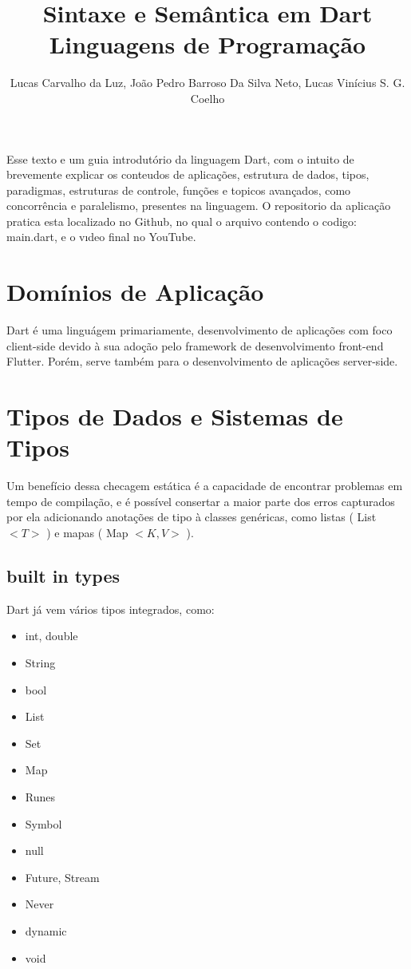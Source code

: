 \documentclass[12pt]{article}
\title{Sintaxe e Semântica em Dart\\ Linguagens de Programação}
\author{Lucas Carvalho da Luz\inst{}, João Pedro Barroso Da Silva Neto\inst{}, Lucas Vinícius S. G. Coelho\inst{}}
\begin{document}
 
\maketitle
\begin{resumo} 
  Esse texto e um guia introdutório da linguagem Dart, com o intuito de brevemente explicar
os conteudos de aplicações, estrutura de dados, tipos, paradigmas, estruturas de controle,
funções e topicos avançados, como concorrência e paralelismo, presentes na linguagem.
O repositorio da aplicação pratica esta localizado no Github, no qual o arquivo
contendo o codigo: main.dart, e o vıdeo final no YouTube.

\end{resumo}

\section{Domínios de Aplicação}
Dart é uma linguágem primariamente, desenvolvimento de aplicações com foco client-side devido à sua adoção pelo framework de desenvolvimento front-end Flutter. Porém, serve também para o desenvolvimento de aplicações server-side.

\section{Tipos de Dados e Sistemas de Tipos}
Um benefício dessa checagem estática é a capacidade de encontrar problemas em tempo de compilação, e é possível consertar a maior parte dos erros capturados por ela adicionando anotações de tipo à classes genéricas, como listas ( List $<T>$ ) e mapas ( Map $<K,V>$ ).

\subsection{built in types}
Dart já vem vários tipos integrados, como:
\begin{itemize}
    \item int, double
    \item String
    \item bool
    \item List
    \item Set
    \item Map
    \item Runes
    \item Symbol
    \item null
    \item Future, Stream
    \item Never
    \item dynamic
    \item void
\end{itemize}
\end{document}
